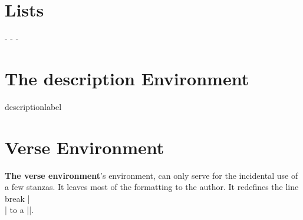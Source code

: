 \section{Lists}                                      
\label{sec:booklists}
\begin{teX}
\if@twocolumn
  \setlength\leftmargini  {2em}
\else
  \setlength\leftmargini  {2.5em}
\fi
\leftmargin  \leftmargini
\setlength\leftmarginii  {2.2em}
\setlength\leftmarginiii {1.87em}
\setlength\leftmarginiv  {1.7em}
\if@twocolumn
  \setlength\leftmarginv  {.5em}
  \setlength\leftmarginvi {.5em}
\else
  \setlength\leftmarginv  {1em}
  \setlength\leftmarginvi {1em}
\fi
\setlength  {}
\setlength  {}
\addtolength{}
\@beginparpenalty -\@lowpenalty
\@endparpenalty   -\@lowpenalty
\@itempenalty     -\@lowpenalty
\renewcommand\theenumi{\@arabic\c@enumi}
\renewcommand\theenumii{\@alph\c@enumii}
\renewcommand\theenumiii{\@roman\c@enumiii}
\renewcommand\theenumiv{\@Alph\c@enumiv}
\newcommand\labelenumi{\theenumi.}
\newcommand\labelenumii{(\theenumii)}
\newcommand\labelenumiii{\theenumiii.}
\newcommand\labelenumiv{\theenumiv.}
\renewcommand\p@enumii{\theenumi}
\renewcommand\p@enumiii{\theenumi(\theenumii)}
\renewcommand\p@enumiv{\p@enumiii\theenumiii}
\newcommand\labelitemi{\textbullet}
\newcommand\labelitemii{\normalfont\bfseries \textendash}
\newcommand\labelitemiii{\textasteriskcentered}
\newcommand\labelitemiv{\textperiodcentered}
\end{teX}


\section{The description Environment}

\begin{docCommand}{descriptionlabel}{}
\end{docCommand}

\begin{teX}
\newenvironment{description}
               {\list{}{\labelwidth\z@ \itemindent-\leftmargin
                        \let\makelabel\descriptionlabel}}
               {\endlist}
               
\newcommand*\descriptionlabel[1]{\hspace\labelsep
                                \normalfont\bfseries #1}
\end{teX}

\section{Verse Environment}
\label{sec:verseenvironment}
\textbf{The verse environment}\quad \latex's  environment, can only serve for the incidental use of a few stanzas. It leaves most of the formatting to the author.  It redefines the line break |\\| to a |\centercr|.


